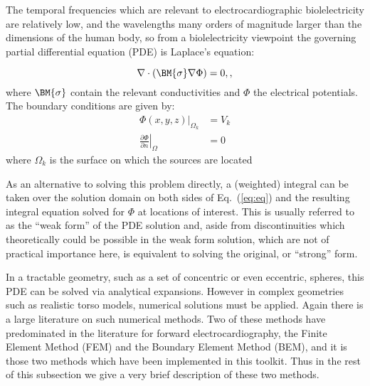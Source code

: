 The temporal frequencies which are relevant to electrocardiographic
biolelectricity are relatively low, and the wavelengths many orders of
magnitude larger than the dimensions of the human body, so from a
biolelectricity viewpoint the governing partial differential equation (PDE)
is Laplace's equation:

\begin{equation} \nabla \cdot (\BM{\sigma} \nabla \Phi) =
0, \label{eq:eq},
\end{equation}
where $\BM{\sigma}$ contain the relevant conductivities and $\Phi$ the
electrical potentials. The boundary
 conditions are given by:
\begin{align} \Phi(x,y,z)|_{\Omega_k} &= V_k\\ \left. \frac{\partial
\Phi}{\partial n} \right|_\Omega &= 0 \label{eq:bc}
\end{align}
where $\Omega_{k}$ is the surface on which the sources are located 

As an alternative to solving this problem directly, a (weighted) integral
can be taken over the solution domain on both sides of Eq.~(\ref{eq:eq})
and the resulting integral equation solved for $\Phi$ at locations of
interest. This is usually referred to as the ``weak form'' of the PDE
solution and, aside from discontinuities which theoretically could be
possible in the weak form solution, which are not of practical importance
here, is equivalent to solving the original, or ``strong'' form. 

In a tractable geometry, such as a set of concentric or even eccentric,
spheres, this PDE can be solved via analytical expansions. However in
complex geometries such as realistic torso models, numerical solutions must
be applied. Again there is a large literature on such numerical
methods. Two of these methods have predominated in the literature for
forward electrocardiography, the Finite Element Method (FEM) and the
Boundary Element Method (BEM), and it is those two methods which have been
implemented in this toolkit. Thus in the rest of this subsection we give a
very brief description of these two methods. 


